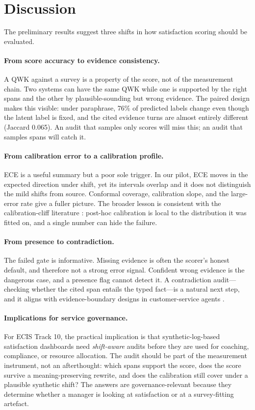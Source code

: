 \documentclass[11pt,a4paper]{article}
\begin{document}
\section{Discussion}

The preliminary results suggest three shifts in how satisfaction scoring should be evaluated.

\paragraph{From score accuracy to evidence consistency.}
A QWK against a survey is a property of the score, not of the measurement chain. Two systems can
have the same QWK while one is supported by the right spans and the other by plausible-sounding
but wrong evidence. The paired design makes this visible: under paraphrase, 76\% of predicted
labels change even though the latent label is fixed, and the cited evidence turns are almost
entirely different (Jaccard 0.065). An audit that samples only scores will miss this; an audit
that samples spans will catch it.

\paragraph{From calibration error to a calibration profile.}
ECE is a useful summary but a poor sole trigger. In our pilot, ECE moves in the expected
direction under shift, yet its intervals overlap and it does not distinguish the mild shifts from
source. Conformal coverage, calibration slope, and the large-error rate give a fuller picture.
The broader lesson is consistent with the calibration-cliff literature
\citep{wang2026care}: post-hoc calibration is local to the distribution it was fitted on, and a
single number can hide the failure.

\paragraph{From presence to contradiction.}
The failed gate is informative. Missing evidence is often the scorer's honest default, and
therefore not a strong error signal. Confident wrong evidence is the dangerous case, and a
presence flag cannot detect it. A contradiction audit---checking whether the cited span entails
the typed fact---is a natural next step, and it aligns with evidence-boundary designs in
customer-service agents \citep{wu2026evidence}.

\paragraph{Implications for service governance.}
For ECIS Track 10, the practical implication is that synthetic-log-based satisfaction dashboards
need \emph{shift-aware} audits before they are used for coaching, compliance, or resource
allocation. The audit should be part of the measurement instrument, not an afterthought: which
spans support the score, does the score survive a meaning-preserving rewrite, and does the
calibration still cover under a plausible synthetic shift? The answers are governance-relevant
because they determine whether a manager is looking at satisfaction or at a survey-fitting
artefact.
\end{document}

